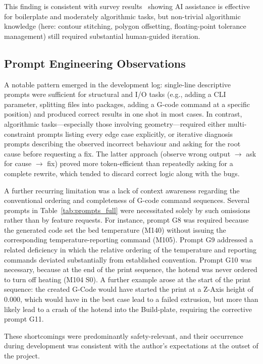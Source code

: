 \documentclass[10pt,twocolumn,a4paper]{article}
\begin{document}
This finding is consistent with survey results~\cite{ziegler2022productivity}
showing AI assistance is effective for boilerplate and moderately
algorithmic tasks, but non-trivial algorithmic knowledge
(here: contour stitching, polygon offsetting, floating-point
tolerance management) still required substantial human-guided iteration.

\subsection{Prompt Engineering Observations}
\label{sec:prompt_obs}

A notable pattern emerged in the development log:
single-line descriptive prompts were sufficient for structural
and I/O tasks (e.g., adding a CLI parameter, splitting files
into packages, adding a G-code command at a specific position)
and produced correct results in one shot in most cases.
In contrast, algorithmic tasks—especially those involving
geometry—required either multi-constraint prompts listing
every edge case explicitly, or iterative diagnosis prompts
describing the observed incorrect behaviour and asking for
the root cause before requesting a fix.
The latter approach (observe wrong output $\to$ ask for cause
$\to$ fix) proved more token-efficient than repeatedly
asking for a complete rewrite, which tended to discard correct
logic along with the bugs.

A further recurring limitation was a lack of context awareness
regarding the conventional ordering and completeness of G-code
command sequences. Several prompts in Table~\ref{tab:prompts_full}
were necessitated solely by such omissions rather than by feature
requests. For instance, prompt G8 was required because the
generated code set the bed temperature (M140) without issuing the
corresponding temperature-reporting command (M105). Prompt G9
addressed a related deficiency in which the relative ordering of
the temperature and reporting commands deviated substantially from
established convention. Prompt G10 was necessary, because at the end of the print sequence, the hotend was never ordered to turn off heating (M104 S0). 
A further example arose at the start of the print sequence: the created G-Code would have started the print at a Z-Axis height of 0.000, which would have in the best case lead to a failed extrusion, but more than likely lead to a crash of the hotend into the Build-plate, requiring the corrective prompt G11.

These shortcomings were predominantly
safety-relevant, and their occurrence during development was
consistent with the author's expectations at the outset of the
project.
\end{document}
